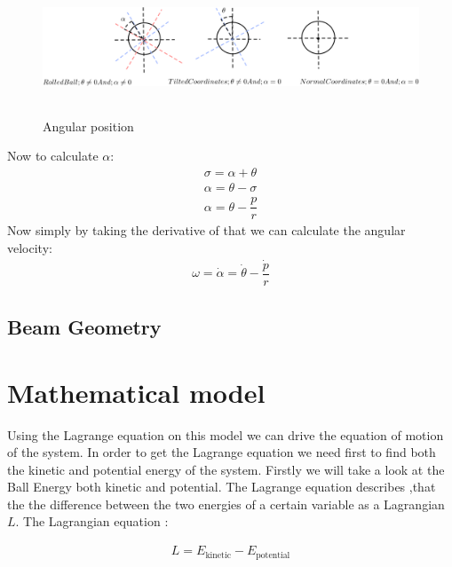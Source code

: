 \documentclass{article}
\begin{document}
\begin{figure}[h]
	\centering
	\includegraphics[height = 4cm,width =12cm]{Angles_System_Geo}
	\caption{Angular position}\label{Angles_System_Geo}
\end{figure}
Now to calculate $\alpha$:
\begin{equation}
	\begin{split}
		\sigma = \alpha + \theta \\
		\alpha = \theta - \sigma \\
		\alpha = \theta - \dfrac{p}{r}		
	\end{split}
\end{equation}
Now simply by taking the derivative of that we can calculate the angular velocity:
\begin{equation}
	\begin{split}
		\omega = \dot{\alpha} = \dot{\theta} - \dfrac{\dot{p}}{r}
	\end{split}
\end{equation}
\newpage
\subsection{Beam Geometry}

\newpage
\section{Mathematical model}
\noindent Using the Lagrange equation on this model we can drive the equation of motion of the system.
In order to get the Lagrange equation we need first to find both the kinetic and potential energy of the system.
Firstly we will take a look at the Ball Energy both kinetic and potential.
The Lagrange equation describes ,that the the difference between the two energies of a certain variable as a Lagrangian $L$.
The Lagrangian equation :

\begin{equation}\label{Lagrangian}
	\begin{split}
		L = E_{\text{kinetic}} - E_{\text{potential}}
	\end{split}
\end{equation}
\end{document}
